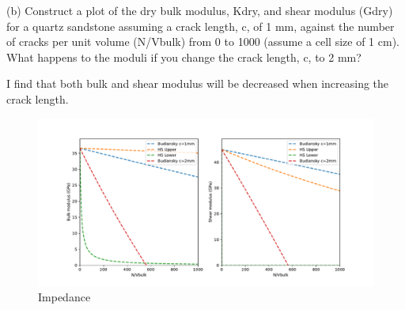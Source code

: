 \begin{problem}{(b)}
    Construct a plot of the dry bulk modulus, Kdry, and shear modulus (Gdry) for a quartz sandstone assuming a crack length, c, of 1 mm, against the number of cracks per unit volume (N/Vbulk) from 0 to 1000 (assume a cell size of 1 cm). What happens to the moduli if you change the crack length, c, to 2 mm?
\end{problem}
\begin{solution}
    I find that both bulk and shear modulus will be decreased when increasing the crack length.
    \begin{figure}[H]
        \centering
        \includegraphics[width=1\textwidth]{figures/homework-2/p2-b.pdf}
        \caption{Impedance}
        \label{fig:p2-b}
    \end{figure}
\end{solution}



